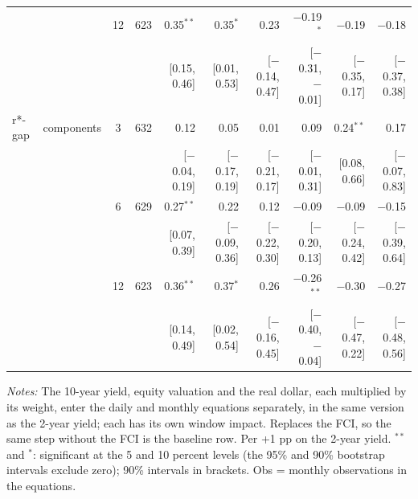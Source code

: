 \begin{longtable}{llcrrrrrrr}
 &  & 12 & 623 & 0.35$^{**}$ & 0.35$^{*}$ & 0.23 & $-$0.19$^{*}$ & $-$0.19 & $-$0.18\\
 & & & & {\scriptsize [0.15, 0.46]} & {\scriptsize [0.01, 0.53]} & {\scriptsize [$-$0.14, 0.47]} & {\scriptsize [$-$0.31, $-$0.01]} & {\scriptsize [$-$0.35, 0.17]} & {\scriptsize [$-$0.37, 0.38]}\\
\addlinespace
r*-gap & components & 3 & 632 & 0.12 & 0.05 & 0.01 & 0.09 & 0.24$^{**}$ & 0.17\\
 & & & & {\scriptsize [$-$0.04, 0.19]} & {\scriptsize [$-$0.17, 0.19]} & {\scriptsize [$-$0.21, 0.17]} & {\scriptsize [$-$0.01, 0.31]} & {\scriptsize [0.08, 0.66]} & {\scriptsize [$-$0.07, 0.83]}\\
 &  & 6 & 629 & 0.27$^{**}$ & 0.22 & 0.12 & $-$0.09 & $-$0.09 & $-$0.15\\
 & & & & {\scriptsize [0.07, 0.39]} & {\scriptsize [$-$0.09, 0.36]} & {\scriptsize [$-$0.22, 0.30]} & {\scriptsize [$-$0.20, 0.13]} & {\scriptsize [$-$0.24, 0.42]} & {\scriptsize [$-$0.39, 0.64]}\\
 &  & 12 & 623 & 0.36$^{**}$ & 0.37$^{*}$ & 0.26 & $-$0.26$^{**}$ & $-$0.30 & $-$0.27\\
 & & & & {\scriptsize [0.14, 0.49]} & {\scriptsize [0.02, 0.54]} & {\scriptsize [$-$0.16, 0.45]} & {\scriptsize [$-$0.40, $-$0.04]} & {\scriptsize [$-$0.47, 0.22]} & {\scriptsize [$-$0.48, 0.56]}\\
\end{longtable}
\begin{flushleft}\footnotesize\textit{Notes:} The 10-year yield, equity valuation and the real dollar, each multiplied by its weight, enter the daily and monthly equations separately, in the same version as the 2-year yield; each has its own window impact. Replaces the FCI, so the same step without the FCI is the baseline row. Per +1 pp on the 2-year yield. $^{**}$ and $^{*}$: significant at the 5 and 10 percent levels (the 95\% and 90\% bootstrap intervals exclude zero); 90\% intervals in brackets. Obs = monthly observations in the equations.\end{flushleft}
\endgroup
